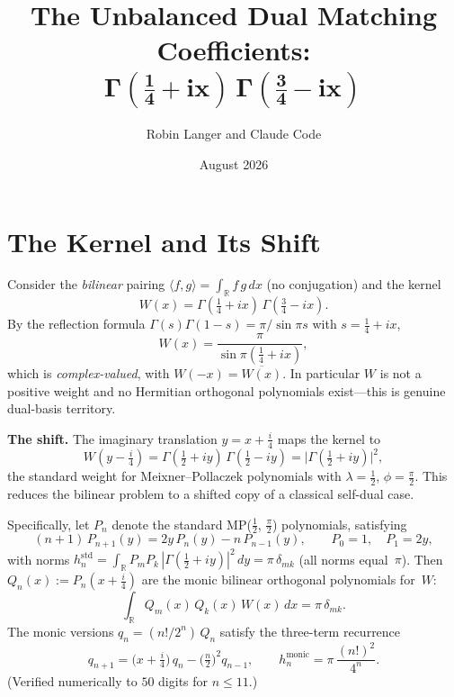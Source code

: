 \documentclass[11pt,a4paper]{article}
\title{\textbf{The Unbalanced Dual Matching Coefficients:\\
$\boldsymbol{\Gamma(\tfrac14+ix)\,\Gamma(\tfrac34-ix)}$}}
\author{Robin Langer and Claude Code}
\date{August 2026}
\newcommand{\R}{\mathbb{R}}
\begin{document}
\maketitle

\section{The Kernel and Its Shift}

Consider the \emph{bilinear} pairing $\langle f, g\rangle = \int_\R f\,g\,dx$
(no conjugation) and the kernel
\[
  W(x) = \Gamma(\tfrac14 + ix)\,\Gamma(\tfrac34 - ix).
\]
By the reflection formula $\Gamma(s)\Gamma(1-s) = \pi/\sin\pi s$
with $s = \tfrac14 + ix$,
\begin{equation}\label{eq:reflection}
  W(x) = \frac{\pi}{\sin\pi(\tfrac14 + ix)},
\end{equation}
which is \emph{complex-valued}, with $W(-x) = \overline{W(x)}$.
In particular $W$ is not a positive weight and no Hermitian
orthogonal polynomials exist---this is genuine dual-basis territory.

\medskip
\noindent\textbf{The shift.}
The imaginary translation $y = x + \tfrac{i}{4}$ maps the kernel to
\[
  W(y - \tfrac{i}{4})
  = \Gamma(\tfrac12 + iy)\,\Gamma(\tfrac12 - iy)
  = \bigl|\Gamma(\tfrac12 + iy)\bigr|^2,
\]
the standard weight for Meixner--Pollaczek polynomials with
$\lambda = \tfrac12$, $\phi = \tfrac\pi2$.  This reduces the
bilinear problem to a shifted copy of a classical self-dual case.

Specifically, let $P_n$ denote the standard MP($\tfrac12$, $\tfrac\pi2$)
polynomials, satisfying
\[
  (n+1)\,P_{n+1}(y) = 2y\,P_n(y) - n\,P_{n-1}(y),
  \qquad P_0 = 1, \quad P_1 = 2y,
\]
with norms $h_n^{\mathrm{std}} = \int_\R P_m P_k\,|\Gamma(\tfrac12+iy)|^2\,dy
= \pi\,\delta_{mk}$ (all norms equal~$\pi$).
Then $Q_n(x) := P_n(x + \tfrac{i}{4})$ are the monic bilinear
orthogonal polynomials for~$W$:
\[
  \int_\R Q_m(x)\,Q_k(x)\,W(x)\,dx = \pi\,\delta_{mk}.
\]
The monic versions $q_n = (n!/2^n)\,Q_n$ satisfy the three-term
recurrence
\begin{equation}\label{eq:recurrence}
  q_{n+1} = \bigl(x + \tfrac{i}{4}\bigr)\,q_n
  - \bigl(\tfrac{n}{2}\bigr)^2 q_{n-1},
  \qquad
  h_n^{\mathrm{monic}}
  = \pi\,\frac{(n!)^2}{4^n}.
\end{equation}
(Verified numerically to $50$ digits for $n \le 11$.)
\end{document}
